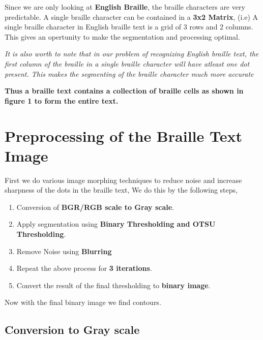 \documentclass{article}
\begin{document}
Since we are only looking at \textbf{English Braille}, the braille characters are very predictable. A single braille character can be 
contained in a \textbf{3x2 Matrix}, (i.e) A single braille character in English braille text is a grid of 3 rows and 2 columns.
This gives an opertunity to make the segmentation and processing optimal.

\emph{It is also worth to note that in our problem of recognizing English braille text, the first column of the braille in a
single braille character will have atleast one dot present. This makes the segmenting of the braille character much more
accurate}


\textbf{Thus a braille text contains a collection of braille cells as shown in figure 1 to form the entire text.}

\section{Preprocessing of the Braille Text Image}

First we do various image morphing techniques to reduce noise and increase sharpness of the dots in the 
braille text, We do this by the following steps,

\begin{enumerate}
  \item Conversion of \textbf{BGR/RGB scale to Gray scale}.
  \item Apply segmentation using \textbf{Binary Thresholding and OTSU Thresholding}.
  \item Remove Noise using \textbf{Blurring}
  \item Repeat the above process for \textbf{3 iterations}.
  \item Convert the result of the final thresholding to \textbf{binary image}.
\end{enumerate}

Now with the final binary image we find contours.

\subsection{Conversion to Gray scale}
\end{document}
